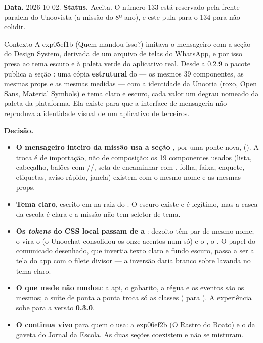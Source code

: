 \textbf{Data.} 2026-10-02. \textbf{Status.} Aceita. O número 133 está
reservado pela frente paralela do Unoovista (a missão do 8º ano), e este pula
para o 134 para não colidir.

\begin{especificacao}{Contexto}
A exp05ef1b (Quem mandou isso?) imitava o mensageiro com a seção
 do Design System, derivada de um arquivo de telas do
WhatsApp, e por isso presa ao tema escuro e à paleta verde do aplicativo real.
Desde a 0.2.9 o pacote publica a seção : uma cópia
\textbf{estrutural} do  --- os mesmos 39 componentes, as
mesmas props e as mesmas medidas --- com a identidade da Unooria (roxo, Open
Sans, Material Symbols) e tema claro e escuro, cada valor um degrau nomeado da
paleta da plataforma. Ela existe para que a interface de mensageria não
reproduza a identidade visual de um aplicativo de terceiros.
\end{especificacao}

\textbf{Decisão.}

\begin{itemize}
  \item \textbf{O mensageiro inteiro da missão usa a seção }, por
    uma ponte nova, 
    (). A troca é de importação, não de composição:
    os 19 componentes usados (lista, cabeçalho, balões com
    //, seta de encaminhar com
    , folha, faixa, enquete, etiquetas, aviso rápido, janela)
    existem com o mesmo nome e as mesmas props.
  \item \textbf{Tema claro}, escrito em  na raiz
    do . O escuro existe e é legítimo, mas a casca da escola é
    clara e a missão não tem seletor de tema.
  \item \textbf{Os \emph{tokens} do CSS local passam de  a
    }: dezoito têm par de mesmo nome; o  vira o
     (o Unoochat consolidou os onze acentos num só) e o
    , o . O papel do comunicado desenhado, que
    invertia texto claro e fundo escuro, passa a ser a tela do app com o filete
    divisor --- a inversão daria branco sobre lavanda no tema claro.
  \item \textbf{O que mede não mudou}: a api, o gabarito, a régua e os eventos
    são os mesmos; a suíte de ponta a ponta troca só as classes (
    para ). A experiência sobe para a versão \textbf{0.3.0}.
  \item \textbf{O  continua vivo} para quem o usa: a
    exp06ef2b (O Rastro do Boato) e o  da gaveta do Jornal
    da Escola. As duas seções coexistem e não se misturam.
\end{itemize}

